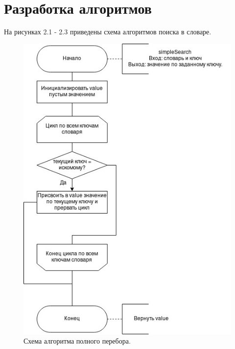 \documentclass[12pt]{report}
\begin{document}
\section{Разработка алгоритмов}
	
На рисунках 2.1 - 2.3 приведены схема алгоритмов поиска в словаре.
	
	\begin{figure}[H]
		\centering
		\includegraphics[scale=0.62]{simple_search.jpg}
		\caption{Схема алгоритма полного перебора.}
		\label{fig:mpr}
	\end{figure}
	
\end{document}
